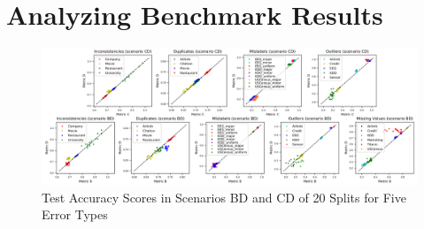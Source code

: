 \section{Analyzing Benchmark Results}


\begin{figure}[]
	\centering
	\includegraphics[angle=-90,scale=.3]{Test_Accuracy_Scores_in_Scenarios_BD_and_CD_of_20_Splits_for_Five_Error_Types}
	\caption{Test Accuracy Scores in Scenarios BD and CD of 20 Splits for Five Error Types}
	\label{fig:Test_Accuracy_Scores_in_Scenarios_BD_and_CD_of_20_Splits_for_Five_Error_Types}
\end{figure}
